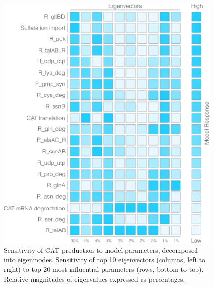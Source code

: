\documentclass[12pt]{article}
\begin{document}
\begin{figure}[ht]
\centering
\includegraphics[width=1.00\textwidth]{./Figures/Sens_productivity.pdf}
\caption{Sensitivity of CAT production to model parameters, decomposed into eigenmodes. Sensitivity of top 10 eigenvectors  (columns, left to right) to top 20 most influential parameters (rows, bottom to top). Relative magnitudes of eigenvalues expressed as percentages.}
\label{fig:Sensitivity-CAT}
\end{figure}
\end{document}
